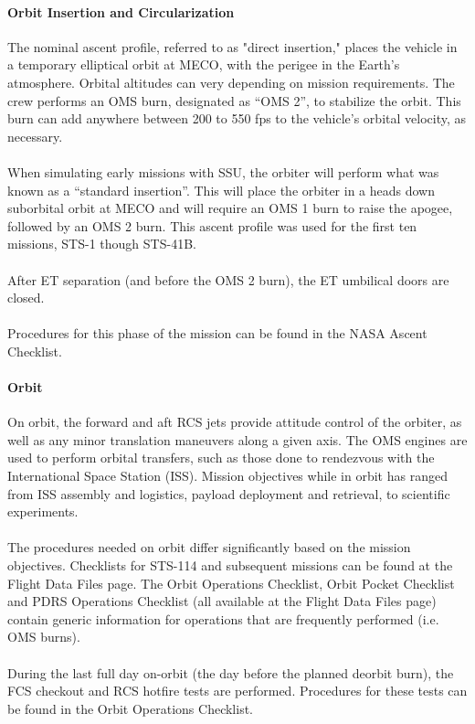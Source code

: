 \documentclass[13pt]{article}
\begin{document}
\begin{multicols*}{2}
\paragraph{Orbit Insertion and Circularization}
The nominal ascent profile, referred to as "direct insertion," places the vehicle in a temporary elliptical orbit at MECO, with the perigee in the Earth's atmosphere. Orbital altitudes can very depending on mission requirements. The crew performs an OMS burn, designated as ``OMS 2'', to stabilize the orbit. This burn can add anywhere between 200 to 550 fps to the vehicle's orbital velocity, as necessary.\\
\\
When simulating early missions with SSU, the orbiter will perform what was known as a ``standard insertion''. This will place the orbiter in a heads down suborbital orbit at MECO and will require an OMS 1 burn to raise the apogee, followed by an OMS 2 burn.  This ascent profile was used for the first ten missions, STS-1 though STS-41B.\\
\\
After ET separation (and before the OMS 2 burn), the ET umbilical doors are closed.\\
\\
Procedures for this phase of the mission can be found in the NASA Ascent Checklist.
\paragraph{Orbit}
On orbit, the forward and aft RCS jets provide attitude control of the orbiter, as well as any minor translation maneuvers along a given axis. The OMS engines are used to perform orbital transfers, such as those done to rendezvous with the International Space Station (ISS). Mission objectives while in orbit has ranged from ISS assembly and logistics, payload deployment and retrieval, to scientific experiments. \\ %
\\
The procedures needed on orbit differ significantly based on the mission objectives. Checklists for STS-114 and subsequent missions can be found at the Flight Data Files page. The Orbit Operations Checklist, Orbit Pocket Checklist and PDRS Operations Checklist (all available at the Flight Data Files page) contain generic information for operations that are frequently performed (i.e. OMS burns).\\
\\
During the last full day on-orbit (the day before the planned deorbit burn), the FCS checkout and RCS hotfire tests are performed. Procedures for these tests can be found in the Orbit Operations Checklist.

\end{multicols*}
\end{document}
